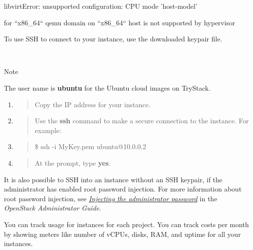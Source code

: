 libvirtError: unsupported configuration: CPU mode 'host-model'

for ``x86\_64`` qemu domain on ``x86\_64`` host is not supported by
hypervisor

\label{connect-to-your-instance-by-using-ssh}

To use SSH to connect to your instance, use the downloaded keypair file.

~

Note

The user name is \textbf{ubuntu} for the Ubuntu cloud images on
TryStack.

\begin{enumerate}
\def\labelenumi{\arabic{enumi}.}
\item
  \begin{quote}
  Copy the IP address for your instance.
  \end{quote}
\item
  \begin{quote}
  Use the \textbf{ssh} command to make a secure connection to the
  instance. For example:
  \end{quote}
\item
  \begin{quote}
  \$ ssh -i MyKey.pem ubuntu@10.0.0.2
  \end{quote}
\item
  \begin{quote}
  At the prompt, type \textbf{yes}.
  \end{quote}
\end{enumerate}

It is also possible to SSH into an instance without an SSH keypair, if
the administrator has enabled root password injection. For more
information about root password injection, see
\href{https://docs.openstack.org/nova/latest/admin/admin-password-injection.html}{\emph{Injecting the administrator password}} in the \emph{OpenStack Administrator
Guide}.

\label{track-usage-for-instances}

You can track usage for instances for each project. You can track costs
per month by showing meters like number of vCPUs, disks, RAM, and uptime
for all your instances.

